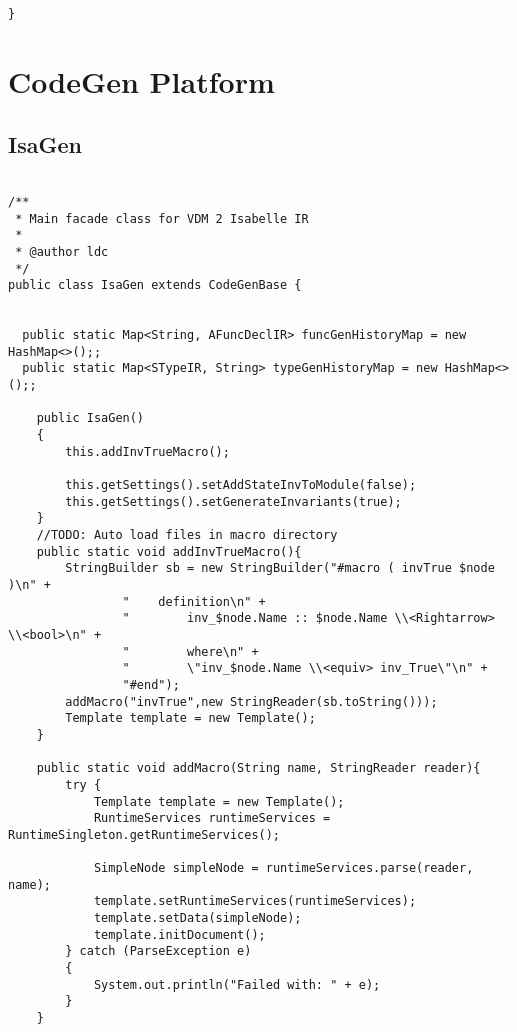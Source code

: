 \begin{appendices}
\begin{lstlisting}
}
\end{lstlisting}
\section{CodeGen Platform}
\subsection{IsaGen} \label{IsaGenafter}
\begin{lstlisting}

/**
 * Main facade class for VDM 2 Isabelle IR
 *
 * @author ldc
 */
public class IsaGen extends CodeGenBase {


  public static Map<String, AFuncDeclIR> funcGenHistoryMap = new HashMap<>();;
  public static Map<STypeIR, String> typeGenHistoryMap = new HashMap<>();;
  
    public IsaGen()
    {
        this.addInvTrueMacro();

        this.getSettings().setAddStateInvToModule(false);
        this.getSettings().setGenerateInvariants(true);
    }
    //TODO: Auto load files in macro directory
    public static void addInvTrueMacro(){
        StringBuilder sb = new StringBuilder("#macro ( invTrue $node )\n" +
                "    definition\n" +
                "        inv_$node.Name :: $node.Name \\<Rightarrow> \\<bool>\n" +
                "        where\n" +
                "        \"inv_$node.Name \\<equiv> inv_True\"\n" +
                "#end");
        addMacro("invTrue",new StringReader(sb.toString()));
        Template template = new Template();
    }

    public static void addMacro(String name, StringReader reader){
        try {
            Template template = new Template();
            RuntimeServices runtimeServices = RuntimeSingleton.getRuntimeServices();

            SimpleNode simpleNode = runtimeServices.parse(reader, name);
            template.setRuntimeServices(runtimeServices);
            template.setData(simpleNode);
            template.initDocument();
        } catch (ParseException e)
        {
            System.out.println("Failed with: " + e);
        }
    }


\end{lstlisting}
\end{appendices}
